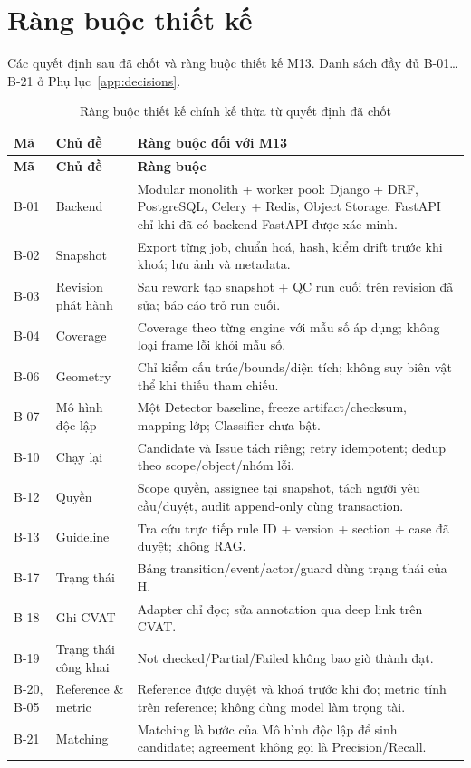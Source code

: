 \section{Ràng buộc thiết kế}
\label{sec:constraints}
Các quyết định sau đã chốt và ràng buộc thiết kế M13. Danh sách đầy đủ B-01…B-21
ở Phụ lục~\ref{app:decisions}.

\begin{xltabular}{\linewidth}{@{}L{1.2cm}L{4cm}Y@{}}
\caption{Ràng buộc thiết kế chính kế thừa từ quyết định đã chốt}\label{tab:constraints}\\
\toprule
\textbf{Mã} & \textbf{Chủ đề} & \textbf{Ràng buộc đối với M13}\\
\midrule
\endfirsthead
\toprule \textbf{Mã} & \textbf{Chủ đề} & \textbf{Ràng buộc}\\ \midrule
\endhead
\bottomrule
\endfoot
B-01 & Backend & Modular monolith + worker pool: Django + DRF, PostgreSQL, Celery + Redis, Object Storage. FastAPI chỉ khi đã có backend FastAPI được xác minh.\\
B-02 & Snapshot & Export từng job, chuẩn hoá, hash, kiểm drift trước khi khoá; lưu ảnh và metadata.\\
B-03 & Revision phát hành & Sau rework tạo snapshot + QC run cuối trên revision đã sửa; báo cáo trỏ run cuối.\\
B-04 & Coverage & Coverage theo từng engine với mẫu số áp dụng; không loại frame lỗi khỏi mẫu số.\\
B-06 & Geometry & Chỉ kiểm cấu trúc/bounds/diện tích; không suy biên vật thể khi thiếu tham chiếu.\\
B-07 & Mô hình độc lập & Một Detector baseline, freeze artifact/checksum, mapping lớp; Classifier chưa bật.\\
B-10 & Chạy lại & Candidate và Issue tách riêng; retry idempotent; dedup theo scope/object/nhóm lỗi.\\
B-12 & Quyền & Scope quyền, assignee tại snapshot, tách người yêu cầu/duyệt, audit append-only cùng transaction.\\
B-13 & Guideline & Tra cứu trực tiếp rule ID + version + section + case đã duyệt; không RAG.\\
B-17 & Trạng thái & Bảng transition/event/actor/guard dùng trạng thái của H.\\
B-18 & Ghi CVAT & Adapter chỉ đọc; sửa annotation qua deep link trên CVAT.\\
B-19 & Trạng thái công khai & Not checked/Partial/Failed không bao giờ thành đạt.\\
B-20, B-05 & Reference \& metric & Reference được duyệt và khoá trước khi đo; metric tính trên reference; không dùng model làm trọng tài.\\
B-21 & Matching & Matching là bước của Mô hình độc lập để sinh candidate; agreement không gọi là Precision/Recall.\\
\end{xltabular}

